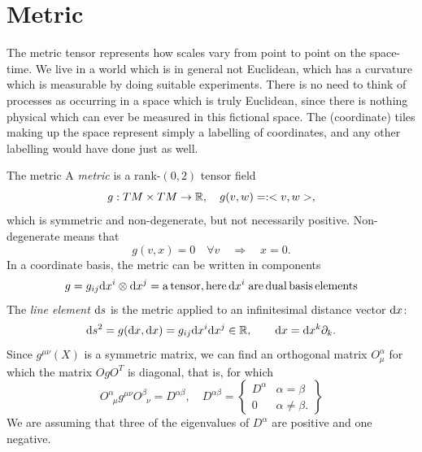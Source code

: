\section{Metric}
The metric tensor represents how scales vary from point to point on the space-time. We live in a world which is in general not Euclidean, which has a curvature which is measurable by doing suitable experiments. There is no need to think of processes as occurring in a space which is truly Euclidean, since there is nothing physical which can ever be measured in this fictional space. The (coordinate) tiles making up the space represent simply a labelling of coordinates, and any other labelling would have done just as well.


\begin{mybox}{The metric}
	A \emph{metric} is a rank-$(0,2)$ tensor field
	\begin{equation}
	g :TM \times TM \rightarrow \mathbb{R}, \quad g(v,w) =: <v,w>,
	\end{equation}
	which is symmetric and non-degenerate, but not necessarily positive. Non-degenerate means that
	\begin{equation}
	g(v,x) = 0 \quad \forall v \quad \Rightarrow \quad x = 0.
	\end{equation} In a coordinate basis, the metric can be written in components 
	\begin{equation}
	g = g_{i j } \mathrm{d} x^i \otimes \mathrm{d} x^j = \mathrm{ a \, tensor, here}\, \mathrm{d} x^i\; \mathrm{ are\, dual\, basis \,elements}
	\end{equation}
	The \emph{line element} $\mathrm{d} s$ is the metric applied to an infinitesimal distance vector $\mathrm{d} x$:
	\begin{equation}
\mathrm{d} s^2 = g(\mathrm{d} x, \mathrm{d} x) = g_{ij} \mathrm{d} x^i \mathrm{d} x^j \in \mathbb{R}, \qquad \mathrm{d} x= \mathrm{d} x^k \partial_k.
	\end{equation}
	Since $g^{\mu \nu}(X)$ is a symmetric matrix, we can find an orthogonal matrix $O^\alpha_\mu$ for which the matrix $OgO^T$ is diagonal, that is, for which
	\begin{equation}
		O^\alpha_{\;\;\mu} g^{\mu \nu} O^\beta_{\;\; \nu} = D^{\alpha \beta} ,\quad D^{\alpha \beta} = \left\{\begin{array}{lr}
		D^\alpha & \alpha=\beta \\
		0 & \alpha \neq \beta.
		\end{array}			\right\}
	\end{equation}
	We are assuming that three of the eigenvalues of $D^\alpha$ are positive and one negative.
\end{mybox}

